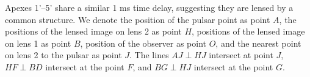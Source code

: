 \documentclass[useAMS,usenatbib]{mn2e}
\begin{document}
Apexes 1'--5' share a similar 1 ms time delay, suggesting they are lensed by
a common structure.
We denote the position of the pulsar point as point $A$, the positions of the lensed image on lens 2 as point $H$, positions of the lensed image on lens 1 as point $B$, position of the observer as point $O$, and the nearest point on lens 2 to the pulsar as point $J$.  
The lines $AJ\perp HJ$ intersect at point $J$, $HF\perp BD$ intersect at the point $F$, and $BG\perp HJ$ intersect at the point $G$.

\end{document}
